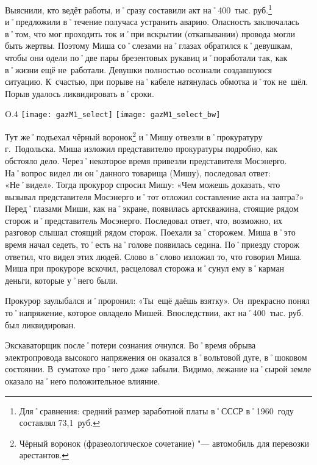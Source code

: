 Выяснили, кто ведёт работы, и˚сразу составили акт на˚400~тыс. руб.\footnote{Для˚сравнения: средний размер заработной платы в˚СССР в˚1960~году составлял 73,1~руб.} и˚предложили в˚течение получаса устранить аварию. Опасность заключалась в˚том, что мог проходить ток и˚при вскрытии (откапывании) провода могли быть жертвы. Поэтому Миша со˚слезами на˚глазах обратился к˚девушкам, чтобы они одели по˚две пары брезентовых рукавиц и˚поработали так, как в˚жизни ещё не~работали. Девушки полностью осознали создавшуюся ситуацию. К~счастью, при порыве на˚кабеле натянулась обмотка и˚ток не~шёл. Порыв удалось ликвидировать в˚сроки. 

\begin{wrapfigure}{O}{.4\textwidth}
\centering
\ifPubTypeEBook
	\texttt{[image: gazM1\_select]}
\else
	\texttt{[image: gazM1\_select\_bw]}
\fi
\caption[Чёрный воронок. Автомобиль ГАЗ-М\=/1 в˚Музее отечественной военной истории]{Чёрный воронок. Автомобиль ГАЗ-М\=/1 в˚Музее отечественной военной истории\footnotemark}
\label{fig:gazM1}
\end{wrapfigure}

Тут же˚подъехал чёрный воронок\footnote{Чёрный воронок (фразеологическое сочетание) "--- автомобиль для перевозки арестантов.} и˚Мишу отвезли в˚прокуратуру г.~Подольска. Миша изложил представителю прокуратуры подробно, как обстояло дело. Через˚некоторое время привезли представителя Мосэнерго. На˚вопрос видел ли он˚данного товарища (Мишу), последовал ответ: «Не˚видел». Тогда прокурор спросил Мишу: «Чем можешь доказать, что вызывал представителя Мосэнерго и˚тот отложил составление акта на завтра?» 
Перед˚глазами Миши, как на˚экране, появилась артскважина, стоящие рядом сторож и˚представитель Мосэнерго. Последовал ответ, что, возможно, их разговор слышал стоящий рядом сторож. Поехали за˚сторожем. Миша в˚это время начал седеть, то˚есть на˚голове появилась седина. По˚приезду сторож ответил, что видел этих людей. Слово в˚слово изложил то, что говорил Миша. Миша при прокуроре вскочил, расцеловал сторожа и˚сунул ему в˚карман деньги, которые у˚него были.

Прокурор заулыбался и˚проронил: «Ты~ещё даёшь взятку». Он~прекрасно понял то˚напряжение, которое овладело Мишей. Впоследствии, акт на˚400~тыс. руб. был ликвидирован.

Экскаваторщик после˚потери сознания очнулся. Во˚время обрыва электропровода высокого напряжения он оказался в˚вольтовой дуге, в˚шоковом состоянии. В~суматохе про˚него даже забыли. Видимо, лежание на˚сырой земле оказало на˚него положительное влияние. 

